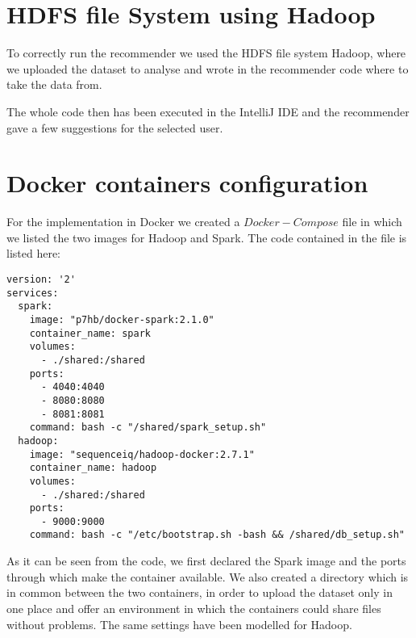 \documentclass[11pt,a4paper,titlepage]{article}
\begin{document}
\section{HDFS file System using Hadoop}
To correctly run the recommender we used the HDFS file system Hadoop, where we uploaded the dataset to analyse and wrote in the recommender code where to take the data from.

The whole code then has been executed in the IntelliJ IDE and the recommender gave a few suggestions for the selected user.


\section{Docker containers configuration}
For the implementation in Docker we created a $Docker-Compose$ file in which we listed the two images for Hadoop and Spark. The code contained in the file is listed here:

\begin{lstlisting}[style=myBashstyle]
version: '2'
services:
  spark:
    image: "p7hb/docker-spark:2.1.0"
    container_name: spark
    volumes:
      - ./shared:/shared
    ports:
      - 4040:4040
      - 8080:8080
      - 8081:8081
    command: bash -c "/shared/spark_setup.sh"
  hadoop:
    image: "sequenceiq/hadoop-docker:2.7.1"
    container_name: hadoop
    volumes:
      - ./shared:/shared
    ports:
      - 9000:9000
    command: bash -c "/etc/bootstrap.sh -bash && /shared/db_setup.sh"
\end{lstlisting}

As it can be seen from the code, we first declared the Spark image and the ports through which make the container available. We also created a directory which is in common between the two containers, in order to upload the dataset only in one place and offer an environment in which the containers could share files without problems. The same settings have been modelled for Hadoop.
\end{document}
